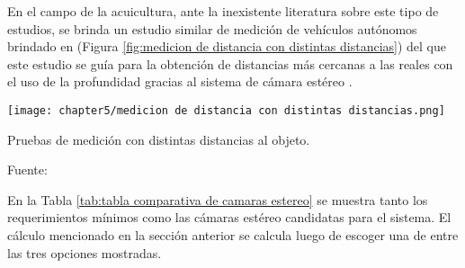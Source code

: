\begin{itemize}
	En el campo de la acuicultura, ante la inexistente literatura sobre este tipo de estudios, se brinda un estudio similar de medición de vehículos autónomos brindado en \cite{Zaarane2020} (Figura \ref{fig:medicion de distancia con distintas distancias}) del que este estudio se guía para la obtención de distancias más cercanas a las reales con el uso de la profundidad gracias al sistema de cámara estéreo .
	
	\begin{myfigure}[H]
		\footnotesize\centering
		\texttt{[image: chapter5/medicion de distancia con distintas distancias.png]}
		\caption{Pruebas de medición con distintas distancias al objeto.}
		\begin{myflushcenter}
			Fuente: \cite{Zaarane2020}
		\end{myflushcenter}
		\label{fig:medicion de distancia con distintas distancias}
	\end{myfigure}
		

	
	En la Tabla \ref{tab:tabla comparativa de camaras estereo} se muestra tanto los requerimientos mínimos como las cámaras estéreo candidatas para el sistema. El cálculo mencionado en la sección anterior se calcula luego de escoger una de entre las tres opciones mostradas.
	

\end{itemize}
